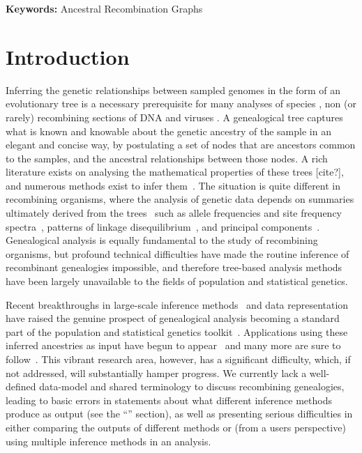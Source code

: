 \documentclass{article}
\begin{document}
\textbf{Keywords:} Ancestral Recombination Graphs

\section*{Introduction}
Inferring the genetic relationships between sampled genomes in the form of an
evolutionary tree is a necessary prerequisite for many analyses of species \citep{rannala2003genetics}, non (or
rarely) recombining sections of DNA \citep{cann1987mitochondrial,underhill2001annalsofhumangenetics} and viruses \citep{grenfell2004science}.
A genealogical tree captures what is known and
knowable about the genetic ancestry of the sample in an elegant and concise
way, by postulating a set of nodes that are ancestors common to the samples,
and the ancestral relationships between those nodes. A rich literature exists
on analysing the mathematical properties of these trees [cite?], and numerous
methods exist to infer them~\citep{felsenstein2004inferring}. The situation is
quite different in recombining organisms, where the analysis of genetic data
depends on summaries ultimately derived from the
trees~\citep{tajima1983evolutionary,tavare1984line}
such as allele frequencies and site frequency
spectra~\citep{achaz2009frequency,ralph2020efficiently},
patterns of linkage disequilibrium~\citep{mcvean2002genealogical}, and principal
components~\citep{mcvean2009genealogical}. Genealogical analysis is equally
fundamental to the study of recombining organisms, but profound technical
difficulties have made the routine inference of recombinant genealogies
impossible, and therefore tree-based analysis methods have been largely
unavailable to the fields of population and statistical
genetics.

Recent breakthroughs in large-scale inference
methods~\citep{rasmussen2014genome,kelleher2019inferring,speidel2019method,
schaefer2021ancestral,wohns2022unified}
and data representation~\citep{kelleher2016efficient}
have raised the genuine prospect of genealogical analysis becoming a standard part
of the population and statistical genetics toolkit~\citep{hejase2020summary}.
Applications using these inferred ancestries as input have
begun to appear~\citep{osmond2021estimating} and many more are sure to
follow~\citep{harris2019database}. This vibrant research area, however,
has a significant difficulty, which, if not addressed, will substantially hamper
progress. We currently lack a well-defined data-model and shared terminology
to discuss recombining genealogies, leading to basic errors in statements
about what different inference methods produce as output (see the
``'' section), as well as presenting serious
difficulties in either comparing the outputs of different methods or
(from a users perspective) using multiple inference methods in an analysis.
\end{document}
